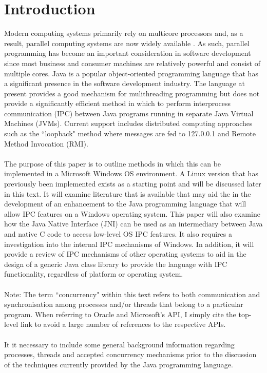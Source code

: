 \documentclass[12pt,a4paper,oneside]{article}
\begin{document}
\section{Introduction}
\begin{spacing}{1.4}
Modern computing systems primarily rely on multicore processors and, as a result, parallel computing systems are now widely available \citep{garg2005concurrent}. As such, parallel programming has become an important consideration in software development since most business and consumer machines are relatively powerful and consist of multiple cores. Java is a popular object-oriented programming language that has a significant presence in the software development industry. The language at present provides a good mechanism for mulithreading programming but does not provide a significantly efficient method in which to perform interprocess communication (IPC) between Java programs running in separate Java Virtual Machines (JVMs). Current support includes distributed computing approaches such as the ``loopback" method where messages are fed to 127.0.0.1 and Remote Method Invocation (RMI)\citep{WellsIPCJava}.
\\\\
The purpose of this paper is to outline methods in which this can be implemented in a Microsoft Windows OS environment. A Linux version that has previously been implemented exists as a starting point and will be discussed later in this text. It will examine literature that is available that may aid the in the development of an enhancement to the Java programming language that will allow IPC features on a Windows operating system. This paper will also examine how the Java Native Interface (JNI) can be used as an intermediary between Java and native C code to access low-level OS IPC features. It also requires a investigation into the internal IPC mechanisms of Windows. In addition, it will provide a review of IPC mechanisms of other operating systems to aid in the design of a generic Java class library to provide the language with IPC functionality, regardless of platform or operating system.
\\\\
Note: The term ``concurrency" within this text refers to both communication and synchronisation among processes and/or threads that belong to a particular program.
When referring to Oracle and Microsoft's API, I simply cite the top-level link to avoid a large number of references to the respective APIs.
\\\\
It it necessary to include some general background information regarding processes, threads and accepted concurrency mechanisms prior to the discussion of the techniques currently provided by the Java programming language.
\end{spacing}
\end{document}
